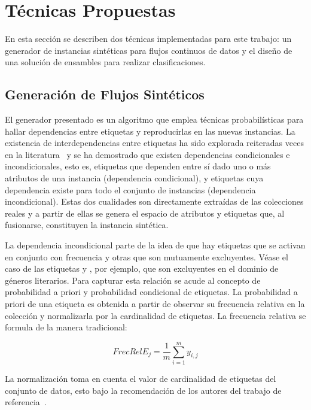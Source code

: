 \section{Técnicas Propuestas}
\label{tecnicas_propuestas}

En esta sección se describen dos técnicas implementadas para este trabajo: un
generador de instancias sintéticas para flujos continuos de datos y el diseño de
una solución de ensambles para realizar clasificaciones.

\subsection{Generación de Flujos Sintéticos}
\label{generacion_flujos_sinteticos}

El generador presentado es un algoritmo que emplea técnicas probabilísticas para
hallar dependencias entre etiquetas y reproducirlas en las nuevas instancias. La
existencia de interdependencias entre etiquetas ha sido explorada reiteradas
veces en la literatura~\cite{tsoumakas_multi-label_2007, read_multi-label_2008}
y se ha demostrado que existen dependencias condicionales e incondicionales,
esto es, etiquetas que dependen entre sí dado uno o más atributos de una
instancia (dependencia condicional), y etiquetas cuya dependencia existe para
todo el conjunto de instancias (dependencia incondicional). Estas dos cualidades
son directamente extraídas de las colecciones reales y a partir de ellas se
genera el espacio de atributos y etiquetas que, al fusionarse, constituyen la
instancia sintética.

La dependencia incondicional parte de la idea de que hay etiquetas que se
activan en conjunto con frecuencia y otras que son mutuamente excluyentes. Véase
el caso de las etiquetas  y , por ejemplo, que son excluyentes en el dominio de géneros literarios.
Para capturar esta relación se acude al concepto de probabilidad a priori y
probabilidad condicional de etiquetas. La probabilidad a priori de una etiqueta
es obtenida a partir de observar su frecuencia relativa en la colección y
normalizarla por la cardinalidad de etiquetas. La frecuencia relativa se formula
de la manera tradicional:

\begin{equation}
	FrecRelE_{j} = \frac{1}{m} \sum_{i=1}^{m} y_{i,j}
\end{equation}

La normalización toma en cuenta el valor de cardinalidad de etiquetas del
conjunto de datos, esto bajo la recomendación de los autores del trabajo de
referencia~\cite{read_scalable_2012}.

